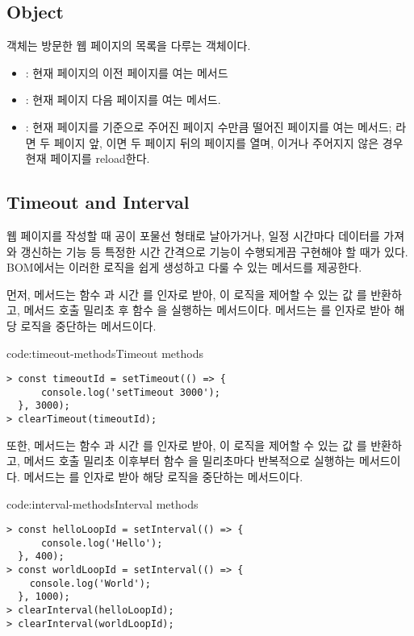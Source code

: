 \subsection*{ Object}

 객체는 방문한 웹 페이지의 목록을 다루는 객체이다.

\begin{itemize}
    \item {}: 현재 페이지의 이전 페이지를 여는 메서드
    \item {}: 현재 페이지 다음 페이지를 여는 메서드.
    \item {}: 현재 페이지를 기준으로 주어진 페이지 수만큼 떨어진 페이지를 여는 메서드; 라면 두 페이지 앞, 이면 두 페이지 뒤의 페이지를 열며, 이거나 주어지지 않은 경우 현재 페이지를 reload한다.
\end{itemize}

\subsection*{Timeout and Interval}

웹 페이지를 작성할 때 공이 포물선 형태로 날아가거나, 일정 시간마다 데이터를 가져와 갱신하는 기능 등 특정한 시간 간격으로 기능이 수행되게끔 구현해야 할 때가 있다. BOM에서는 이러한 로직을 쉽게 생성하고 다룰 수 있는 메서드를 제공한다.

먼저,  메서드는 함수 과 시간 를 인자로 받아, 이 로직을 제어할 수 있는 값 를 반환하고, 메서드 호출  밀리초 후 함수 을 실행하는 메서드이다.  메서드는 를 인자로 받아 해당 로직을 중단하는 메서드이다.

\begin{code}{code:timeout-methods}{Timeout methods}
\begin{verbatim}
> const timeoutId = setTimeout(() => {
      console.log('setTimeout 3000');
  }, 3000);
> clearTimeout(timeoutId);
\end{verbatim}
\end{code}

또한,  메서드는 함수 과 시간 를 인자로 받아, 이 로직을 제어할 수 있는 값 를 반환하고, 메서드 호출  밀리초 이후부터 함수 을  밀리초마다 반복적으로 실행하는 메서드이다.  메서드는 를 인자로 받아 해당 로직을 중단하는 메서드이다.

\begin{code}{code:interval-methods}{Interval methods}
\begin{verbatim}
> const helloLoopId = setInterval(() => {
      console.log('Hello');
  }, 400);
> const worldLoopId = setInterval(() => {
    console.log('World');
  }, 1000);
> clearInterval(helloLoopId);
> clearInterval(worldLoopId);
\end{verbatim}
\end{code}
